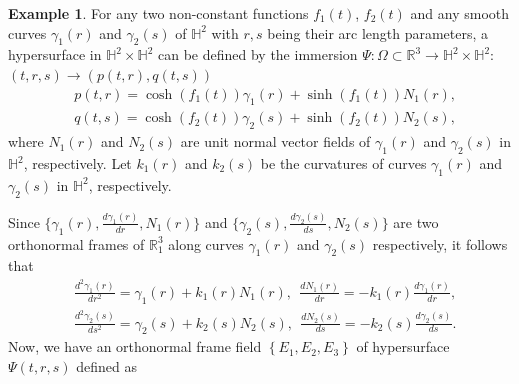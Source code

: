 \documentclass[reqno]{amsart}%
\theoremstyle{definition}
\newtheorem{example}[theorem]{Example}
\numberwithin{equation}{section}
\begin{document}
\begin{example}\label{exam:4.1}
For any two non-constant functions $f_1(t)$, $f_2(t)$ and any smooth curves $\gamma_1(r)$ and $\gamma_2(s)$
of $\mathbb{H}^2$ with $r,s$ being their arc length parameters, a hypersurface in
$\mathbb{H}^2\times\mathbb{H}^2$ can be defined by the immersion
$\Psi:\Omega\subset\mathbb{R}^3\rightarrow\mathbb{H}^2\times\mathbb{H}^2$:
$(t,r,s)\rightarrow(p(t,r),q(t,s))$
%
\begin{equation}\label{eqn:3.1ss1}
\begin{aligned}
&p(t,r)=\cosh(f_1(t))\gamma_1(r)+\sinh(f_1(t))N_1(r),\\
&q(t,s)=\cosh(f_2(t))\gamma_2(s)+\sinh(f_2(t))N_2(s),
\end{aligned}	
\end{equation}
%
where $N_1(r)$ and $N_2(s)$ are unit normal vector fields of $\gamma_1(r)$ and
$\gamma_2(s)$ in $\mathbb{H}^2$, respectively.
Let $k_1(r)$ and $k_2(s)$ be the curvatures of
curves $\gamma_1(r)$ and $\gamma_2(s)$ in $\mathbb{H}^2$, respectively.

Since $\{\gamma_1(r), \frac{d\gamma_1(r)}{dr}, N_1(r)\}$ and $\{\gamma_2(s),
\frac{d\gamma_2(s)}{ds}, N_2(s)\}$ are two orthonormal frames
of $\mathbb{R}_1^{3}$ along curves $\gamma_1(r)$ and $\gamma_2(s)$ respectively, it follows that
\begin{equation}\label{eqn:3.2ss1}
\begin{aligned}
&\frac{d^2\gamma_1(r)}{dr^2}=\gamma_1(r)+k_1(r)N_1(r),\ \
\frac{dN_1(r)}{dr}=-k_1(r)\frac{d\gamma_1(r)}{dr},\\
&\frac{d^2\gamma_2(s)}{ds^2}=\gamma_2(s)+k_2(s)N_2(s),\ \
\frac{dN_2(s)}{ds}=-k_2(s)\frac{d\gamma_2(s)}{ds}.
\end{aligned} 	
\end{equation}%
Now, we have an orthonormal frame field $\left\{E_{1}, E_{2}, E_{3}\right\}$
of hypersurface $\Psi(t,r,s)$ defined as


\end{example}
\end{document}
